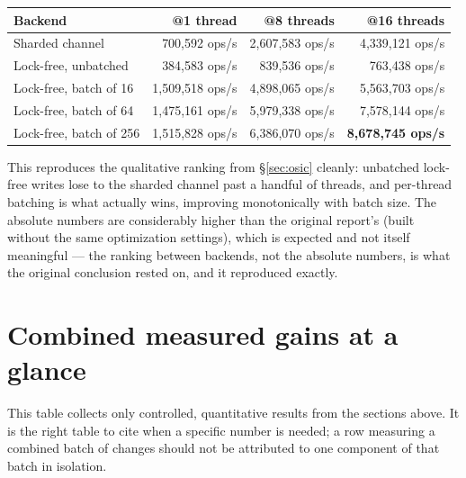 \documentclass[11pt]{article}
\begin{document}
\begin{center}
\begin{tabular}{lrrr}
\toprule
Backend & @1 thread & @8 threads & @16 threads \\
\midrule
Sharded channel & 700,592 ops/s & 2,607,583 ops/s & 4,339,121 ops/s \\
Lock-free, unbatched & 384,583 ops/s & 839,536 ops/s & 763,438 ops/s \\
Lock-free, batch of 16 & 1,509,518 ops/s & 4,898,065 ops/s & 5,563,703 ops/s \\
Lock-free, batch of 64 & 1,475,161 ops/s & 5,979,338 ops/s & 7,578,144 ops/s \\
Lock-free, batch of 256 & 1,515,828 ops/s & 6,386,070 ops/s & \textbf{8,678,745 ops/s} \\
\bottomrule
\end{tabular}
\end{center}

This reproduces the qualitative ranking from \S\ref{sec:osic} cleanly: unbatched
lock-free writes lose to the sharded channel past a handful of threads, and
per-thread batching is what actually wins, improving monotonically with batch size.
The absolute numbers are considerably higher than the original report's (built
without the same optimization settings), which is expected and not itself
meaningful --- the ranking between backends, not the absolute numbers, is what the
original conclusion rested on, and it reproduced exactly.

\section{Combined measured gains at a glance}
\label{sec:combined}

This table collects only controlled, quantitative results from the sections above.
It is the right table to cite when a specific number is needed; a row measuring a
combined batch of changes should not be attributed to one component of that batch in
isolation.
\end{document}
